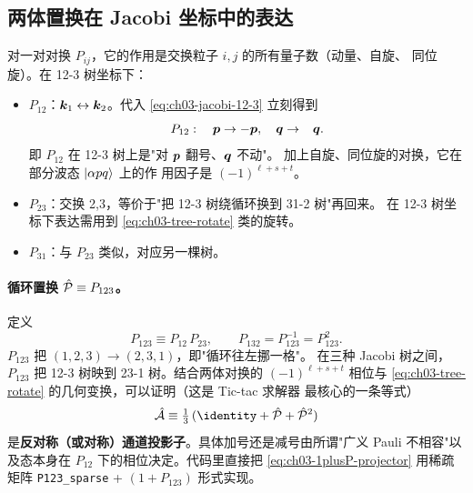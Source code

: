 \subsection{两体置换在 Jacobi 坐标中的表达}
\label{subsec:ch03-perm-jacobi}

对一对对换 \(P_{ij}\)，它的作用是交换粒子 \(i, j\) 的所有量子数（动量、自旋、
同位旋）。在 12-3 树坐标下：
\begin{itemize}
  \item \(P_{12}\)：\(\bm{k}_1 \leftrightarrow \bm{k}_2\)。代入
        \cref{eq:ch03-jacobi-12-3} 立刻得到
        \begin{equation}
        \label{eq:ch03-P12-action}
        P_{12}: \quad
        \bm{p} \to -\bm{p}, \quad
        \bm{q} \to \phantom{-}\bm{q}.
        \end{equation}
        即 \(P_{12}\) 在 12-3 树上是"对 \(\bm{p}\) 翻号、\(\bm{q}\) 不动"。
        加上自旋、同位旋的对换，它在部分波态 \(\ket{\alpha p q}\) 上的作
        用因子是 \((-1)^{\ell + s + t}\)。
  \item \(P_{23}\)：交换 2,3，等价于"把 12-3 树绕循环换到 31-2 树"再回来。
        在 12-3 树坐标下表达需用到 \cref{eq:ch03-tree-rotate} 类的旋转。
  \item \(P_{31}\)：与 \(P_{23}\) 类似，对应另一棵树。
\end{itemize}

\paragraph{循环置换 \(\hat{\mathcal{P}} \equiv P_{123}\)。}
定义
\begin{equation}
\label{eq:ch03-P123-def}
P_{123} \equiv P_{12}\,P_{23},
\qquad
P_{132} = P_{123}^{-1} = P_{123}^{2}.
\end{equation}
\(P_{123}\) 把 \((1,2,3) \to (2,3,1)\)，即"循环往左挪一格"。
在三种 Jacobi 树之间，\(P_{123}\) 把 12-3 树映到 23-1 树。结合两体对换的 \((-1)^{\ell + s + t}\)
相位与 \cref{eq:ch03-tree-rotate} 的几何变换，可以证明（这是 Tic-tac 求解器
最核心的一条等式）
\begin{equation}
\label{eq:ch03-1plusP-projector}
\Aop \equiv \tfrac{1}{3}\,(\identity + \Pop + \Pop^{2})
\end{equation}
是\textbf{反对称（或对称）通道投影子}。具体加号还是减号由所谓"广义 Pauli
不相容"以及态本身在 \(P_{12}\) 下的相位决定。代码里直接把
\cref{eq:ch03-1plusP-projector} 用稀疏矩阵 \texttt{P123\_sparse} +
\((1+P_{123})\) 形式实现。

